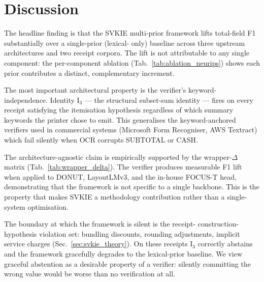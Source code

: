 \section{Discussion}
\label{sec:discussion}

The headline finding is that the SVKIE multi-prior framework lifts
\textsf{total}-field F1 substantially over a single-prior (lexical-
only) baseline across three upstream architectures and two receipt
corpora.  The lift is not attributable to any single component:
the per-component ablation (Tab.~\ref{tab:ablation_neurips}) shows
each prior contributes a distinct, complementary increment.

The most important architectural property is the verifier's
keyword-independence.  Identity $\mathrm{I}_3$ — the structural
subset-sum identity — fires on every receipt satisfying the
itemisation hypothesis regardless of which summary keywords the
printer chose to emit.  This generalises the keyword-anchored
verifiers used in commercial systems (Microsoft Form Recogniser,
AWS Textract) which fail silently when OCR corrupts
\textsf{SUBTOTAL} or \textsf{CASH}.

The architecture-agnostic claim is empirically supported by the
wrapper-$\Delta$ matrix (Tab.~\ref{tab:wrapper_delta}).  The
verifier produces measurable F1 lift when applied to DONUT,
LayoutLMv3, and the in-house FOCUS-T head, demonstrating that the
framework is not specific to a single backbone.  This is the
property that makes SVKIE a methodology contribution rather than a
single-system optimisation.

The boundary at which the framework is silent is the receipt-
construction-hypothesis violation set: bundling discounts, rounding
adjustments, implicit service charges (Sec.~\ref{sec:svkie_theory}).
On these receipts $\mathrm{I}_3$ correctly abstains and the
framework gracefully degrades to the lexical-prior baseline.  We
view graceful abstention as a desirable property of a verifier:
silently committing the wrong value would be worse than no
verification at all.
